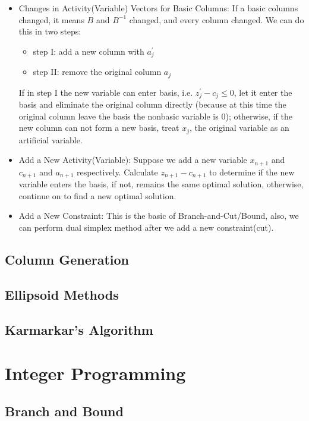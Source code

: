 \begin{itemize}
\begin{itemize}
						\item Changes in Activity(Variable) Vectors for Basic Columns: If a basic columns changed, it means $B$ and $B^{-1}$ changed, and every column changed. We can do this in two steps:
						\begin{itemize}
							\item step I: add a new column with $a_j^\prime$
							\item step II: remove the original column $a_j$
						\end{itemize}
						If in step I the new variable can enter basis, i.e. $z_j^\prime  - c_j \le 0$, let it enter the basis and eliminate the original column directly (because at this time the original column leave the basis the nonbasic variable is 0); otherwise, if the new column can not form a new basis, treat $x_j$, the original variable as an artificial variable.
						\item Add a New Activity(Variable): Suppose we add a new variable $x_{n+1}$ and $c_{n+1}$ and $a_{n+1}$ respectively. Calculate $z_{n+1} - c_{n+1}$ to determine if the new variable enters the basis, if not, remains the same optimal solution, otherwise, continue on to find a new optimal solution.
						\item Add a New Constraint: This is the basic of Branch-and-Cut/Bound, also, we can perform dual simplex method after we add a new constraint(cut).
					\end{itemize}
				\end{itemize}			

		\chapter{Column Generation}

		\chapter{Ellipsoid Methods}

		\chapter{Karmarkar's Algorithm}

	\part{Integer Programming}\label{IP}
		\chapter{Branch and Bound}
